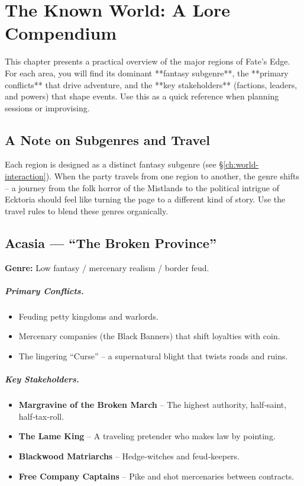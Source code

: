 \chapter{The Known World: A Lore Compendium}
\label{ch:lore-compendium}

This chapter presents a practical overview of the major regions of Fate’s Edge. For each area, you will find its dominant **fantasy subgenre**, the **primary conflicts** that drive adventure, and the **key stakeholders** (factions, leaders, and powers) that shape events. Use this as a quick reference when planning sessions or improvising.

\section{A Note on Subgenres and Travel}

Each region is designed as a distinct fantasy subgenre (see \S\ref{ch:world-interaction}). When the party travels from one region to another, the genre shifts – a journey from the folk horror of the Mistlands to the political intrigue of Ecktoria should feel like turning the page to a different kind of story. Use the travel rules to blend these genres organically.

\section{Acasia — “The Broken Province”}
\textbf{Genre:} Low fantasy / mercenary realism / border feud.

\paragraph{Primary Conflicts.}
\begin{itemize}
  \item Feuding petty kingdoms and warlords.
  \item Mercenary companies (the Black Banners) that shift loyalties with coin.
  \item The lingering “Curse” – a supernatural blight that twists roads and ruins.
\end{itemize}

\paragraph{Key Stakeholders.}
\begin{itemize}
  \item \textbf{Margravine of the Broken March} – The highest authority, half‑saint, half‑tax‑roll.
  \item \textbf{The Lame King} – A traveling pretender who makes law by pointing.
  \item \textbf{Blackwood Matriarchs} – Hedge‑witches and feud‑keepers.
  \item \textbf{Free Company Captains} – Pike and shot mercenaries between contracts.
\end{itemize}


